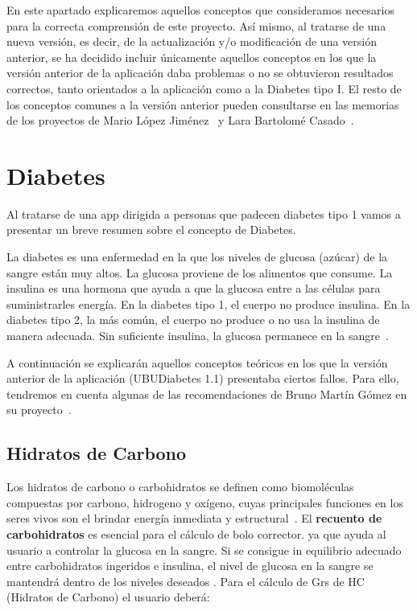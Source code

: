 
En este apartado explicaremos aquellos conceptos que consideramos necesarios para la correcta comprensión de este proyecto.
Así mismo, al tratarse de una nueva versión, es decir, de la actualización y/o modificación de una versión anterior, se ha decidido incluir únicamente aquellos conceptos en los que la versión anterior de la aplicación daba problemas o no se obtuvieron resultados correctos, tanto orientados a la aplicación como a la Diabetes tipo I. El resto de los conceptos comunes a la versión anterior pueden consultarse en las memorias de los proyectos de Mario López Jiménez~\cite{mario2016} y Lara Bartolomé Casado~\cite{larab2015}.

\section{Diabetes}
Al tratarse de una app dirigida a personas que padecen diabetes tipo 1 vamos a presentar un breve resumen sobre el concepto de Diabetes.

La diabetes es una enfermedad en la que los niveles de glucosa (azúcar) de la sangre están muy altos. La glucosa proviene de los alimentos que consume. La insulina es una hormona que ayuda a que la glucosa entre a las células para suministrarles energía. En la diabetes tipo 1, el cuerpo no produce insulina. En la diabetes tipo 2, la más común, el cuerpo no produce o no usa la insulina de manera adecuada. Sin suficiente insulina, la glucosa permanece en la sangre~\cite{medlineplus}.

A continuación se explicarán aquellos conceptos teóricos en los que la versión anterior de la aplicación (UBUDiabetes 1.1) presentaba ciertos fallos. Para ello, tendremos en cuenta algunas de las recomendaciones de Bruno Martín Gómez en su proyecto~\cite{bruno2017}.

\subsection{Hidratos de Carbono}
Los hidratos de carbono o carbohidratos se definen como biomoléculas compuestas por carbono, hidrogeno y oxígeno, cuyas principales funciones en los seres vivos son el brindar energía inmediata y estructural~\cite{wiki:carbs}.
El \textbf{recuento de carbohidratos} es esencial para el cálculo de bolo corrector. ya que ayuda al usuario a controlar la glucosa en la sangre. Si se consigue in equilibrio adecuado entre carbohidratos ingeridos e insulina, el nivel de glucosa en la sangre se mantendrá dentro de los niveles deseados \cite{larab2015}.
Para el cálculo de Grs de HC (Hidratos de Carbono) el usuario deberá:

